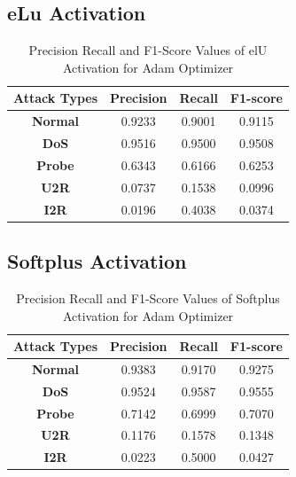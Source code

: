 \documentclass[12pt, a4paper]{report}
\begin{document}
\begin{appendices}
	\subsection{eLu Activation}
   \begin{table}[h]
	\centering
	\captionsetup{justification=centering,margin=2cm}
	\begin{tabular}{|c|c|c|c|}
	\hline
	\textbf{Attack Types} & \textbf{Precision} & \textbf{Recall} & \textbf{F1-score} \\ \hline
	\textbf{Normal}       & 0.9233             & 0.9001          & 0.9115            \\ \hline
	\textbf{DoS}          & 0.9516             & 0.9500          & 0.9508            \\ \hline
	\textbf{Probe}        & 0.6343             & 0.6166          & 0.6253            \\ \hline
	\textbf{U2R}          & 0.0737             & 0.1538          & 0.0996            \\ \hline
	\textbf{I2R}          & 0.0196             & 0.4038          & 0.0374            \\ \hline
	\end{tabular}
	\caption{Precision Recall and F1-Score Values of elU Activation for Adam Optimizer}
	\label{classification elu adam tflearn}
	\end{table} 
	
	\clearpage
	\subsection{Softplus Activation}
   \begin{table}[ht]
	\centering
	\captionsetup{justification=centering,margin=2cm}
	\begin{tabular}{|c|c|c|c|}
	\hline
	\textbf{Attack Types} & \textbf{Precision} & \textbf{Recall} & \textbf{F1-score} \\ \hline
	\textbf{Normal}       & 0.9383             & 0.9170          & 0.9275            \\ \hline
	\textbf{DoS}          & 0.9524             & 0.9587          & 0.9555            \\ \hline
	\textbf{Probe}        & 0.7142             & 0.6999          & 0.7070            \\ \hline
	\textbf{U2R}          & 0.1176             & 0.1578          & 0.1348            \\ \hline
	\textbf{I2R}          & 0.0223             & 0.5000          & 0.0427            \\ \hline
	\end{tabular}
	\caption{Precision Recall and F1-Score Values of Softplus Activation for Adam Optimizer}
	\label{classification softplus adam tflearn}
	\end{table} 
	

\end{appendices}
\end{document}
